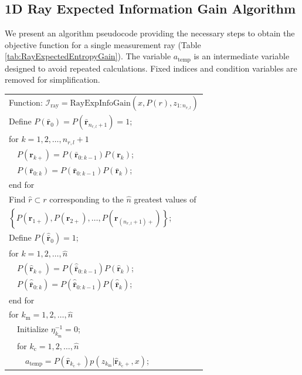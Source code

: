 \documentclass[letterpaper, 10pt, conference]{ieeeconf}
\newcommand{\braces}[1]{\ensuremath{\left\{ #1 \right\}}}
\begin{document}
\subsection{1D Ray Expected Information Gain Algorithm}

We present an algorithm pseudocode providing the necessary steps to obtain the objective function for a single measurement ray (Table \ref{tab:RayExpectedEntropyGain}). The variable $a_\text{temp}$ is an intermediate variable designed to avoid repeated calculations.
Fixed indices and condition variables are removed for simplification.

\begin{table}
\begin{tabular}{ l }
  Function: $\mathcal I_\text{ray}=\text{RayExpInfoGain}(x,P(r),z_{1:n_{r,l}})$\\
  Define $P(\bar{\mathbf{r}}_{0})=P(\bar{\mathbf{r}}_{n_{r,l}+1})=1$;\\
  for $k = 1,2,\ldots,n_{r,l}+1$\\
   \ \ $P(\mathbf{r}_{k+}) = P(\bar{\mathbf{r}}_{0:k-1})P(\mathbf{r}_{k})$;\\
   \ \ $P(\bar{\mathbf{r}}_{0:k})=P(\bar{\mathbf{r}}_{0:k-1})P(\bar{\mathbf{r}}_{k})$;\\
  end for\\
  Find $\hat r\subset r$ corresponding to the $\hat n$ greatest values of\\
  $\braces{P(\mathbf{r}_{1+}),P(\mathbf{r}_{2+}),\ldots,P(\mathbf{r}_{(n_{r,l}+1)+})}$;\\
  Define $P(\hat{\bar{\mathbf{r}}}_{0})=1$;\\
  for $k = 1,2,\ldots,\hat{n}$\\
   \ \ $P(\hat{\mathbf{r}}_{k+}) = P(\hat{\bar{\mathbf{r}}}_{0:k-1})P(\hat{\mathbf{r}}_{k})$;\\
   \ \ $P(\hat{\bar{\mathbf{r}}}_{0:k})=P(\hat{\bar{\mathbf{r}}}_{0:k-1})P(\hat{\bar{\mathbf{r}}}_{k})$;\\
  end for\\
  for $k_\text{m}=1,2,\ldots,\hat n$\\
   \ \ Initialize $\eta^{-1}_{k_\text{m}}=0$;\\
   \ \ for $k_\text{c}=1,2,\ldots,\hat n$\\
   \ \ \ \ $a_\text{temp}=P(\hat{\mathbf{r}}_{k_\text{c}+})p(z_{k_\text{m}}|\hat{\mathbf{r}}_{k_\text{c}+},x)$;\\

\end{tabular}
\end{table}
\end{document}
